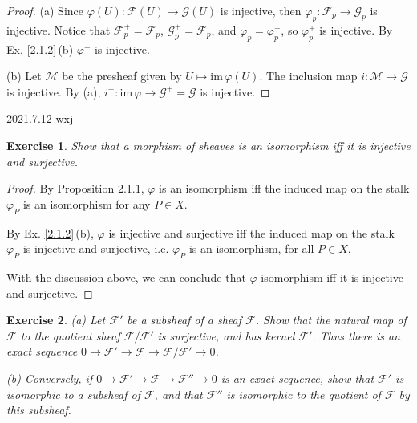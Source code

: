 \documentclass[12pt]{amsart}
\newtheorem{exe}{Exercise}[subsection]
\begin{document}
\begin{proof}
    (a) Since $\varphi(U) :\mathscr{F}(U) \rightarrow  \mathscr{G}(U) $ is injective, then $\varphi_p :\mathscr{F}_p \rightarrow  \mathscr{G}_p $ is injective.
    Notice that $\mathscr{F}_p^+=\mathscr{F}_p$, $\mathscr{G}_p^+=\mathscr{F}_p$, and $\varphi_p=\varphi_p^+$, so $\varphi_p^+$ is injective.
    By Ex. \ref{2.1.2}\,(b) $\varphi^+$ is injective.

    (b) Let $\mathscr{M}$ be the presheaf given by $U\mapsto\mathrm{im}\,\varphi(U)$. The inclusion map $i: \mathscr{M} \rightarrow  \mathscr{G}$ is injective. By (a), $i^+:\mathrm{im}\,\varphi \rightarrow  \mathscr{G}^+=\mathscr{G}$
    is injective.
\end{proof}    

2021.7.12 wxj
\begin{exe}
	\label{2.1.5}
   Show that a morphism of sheaves is an isomorphism iff it is injective and surjective.
\end{exe}

\begin{proof}
   By Proposition 2.1.1, $\varphi$ is an isomorphism iff the induced map on the stalk $\varphi_{P}$ is an isomorphism for any $P \in X$. 
   
   By Ex. \ref{2.1.2}\,(b), $\varphi$ is injective and surjective iff the induced map on the stalk $\varphi_{P}$ is injective and surjective, i.e. $\varphi_P$ is an isomorphism, for all $P \in X$.
   
   With the discussion above, we can conclude that $\varphi$ isomorphism iff it is injective and surjective.
\end{proof}

\begin{exe}
   (a) Let $\mathscr{F}'$ be a subsheaf of a sheaf $\mathscr{F}$. Show that the natural map of $\mathscr{F}$ to the quotient sheaf $\mathscr{F}/\mathscr{F}'$ is surjective, and has kernel $\mathscr{F}'$. Thus there is an exact sequence $0 \rightarrow \mathscr{F}' \rightarrow \mathscr{F} \rightarrow \mathscr{F}/\mathscr{F}' \rightarrow 0$.
   
   (b) Conversely, if $0 \rightarrow \mathscr{F}' \rightarrow \mathscr{F} \rightarrow \mathscr{F}'' \rightarrow 0$ is an exact sequence, show that $\mathscr{F}'$ is isomorphic to a subsheaf of $\mathscr{F}$, and that $\mathscr{F}''$ is isomorphic to the quotient of $\mathscr{F}$ by this subsheaf.
\end{exe}
\end{document}

